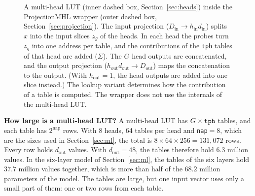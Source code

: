 \documentclass[11pt]{article}
\DeclareRobustCommand{\code}[1]{{\renewcommand{\_}{\textunderscore\allowbreak}\texttt{#1}}}
\begin{document}
\begin{figure}[t]
\caption{A multi-head LUT (inner dashed box, Section~\ref{sec:heads}) inside the ProjectionMHL wrapper
(outer dashed box, Section~\ref{sec:projection}). The input projection
($D_\text{in}\to h_\text{in}d_\text{in}$) splits $x$ into the input slices $z_g$ of the heads. In each
head the probes turn $z_g$ into one address per table, and the contributions of the \code{tph} tables of
that head are added ($\Sigma$). The $G$ head outputs are concatenated, and the output projection
($h_\text{out}d_\text{out}\to D_\text{out}$) maps the concatenation to the output. (With
$h_\text{out}=1$, the head outputs are added into one slice instead.) The lookup variant determines how the
contribution of a table is computed. The wrapper does not use the internals of the multi-head LUT.}
\label{fig:projlut}
\end{figure}

\textbf{How large is a multi-head LUT?} A multi-head LUT has $G\times\code{tph}$ tables, and each table
has $2^{\text{nap}}$ rows. With 8 heads, 64 tables per head and \code{nap}$=8$, which are the sizes used
in Section~\ref{sec:ml}, the total is $8\times64\times256=131{,}072$ rows. Every row holds
$d_\text{out}$ values. With $d_\text{out}=48$, the tables therefore hold $6.3$ million values. In the
six-layer model of Section~\ref{sec:ml}, the tables of the six layers hold $37.7$ million values
together, which is more than half of the $68.2$ million parameters of the model. The tables are large,
but one input vector uses only a small part of them: one or two rows from each table.
\end{document}

